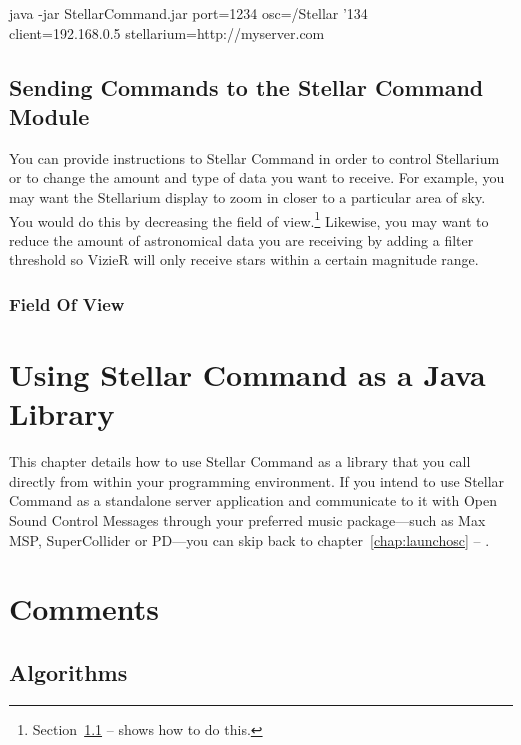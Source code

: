 \documentclass[10pt,a4paper,extrafontsizes]{memoir}
\begin{document}
   \begin{syntax}
	\medskip
	java -jar StellarCommand.jar port=1234 osc=/Stellar  {\char'134}\\client=192.168.0.5 stellarium=http://myserver.com\\
	\medskip
\end{syntax}
\bigskip

\clearpage
\pagestyle{ruled}

\section{Sending Commands to the Stellar Command Module}
You can provide instructions to Stellar Command in order to control Stellarium or to change the amount and type of data you want to receive. For example, you may want the Stellarium display to zoom in closer to a particular area of sky. You would do this by decreasing the field of view.\footnote{Section~\ref{subsec:fieldofview} --
	\emph{} shows how to do this.} Likewise, you may want to reduce the amount of astronomical data you are receiving by adding a filter threshold so VizieR will only receive stars within a certain magnitude range. 


\subsection{Field Of View}\label{subsec:fieldofview}
\chapter{Using Stellar Command as a Java Library} \label{chap:libraryosc}
This chapter details how to use Stellar Command as a library that you call directly from within your programming environment.
If you intend to use Stellar Command as a standalone server application and communicate to it with Open Sound Control Messages through your preferred music package---such as Max MSP, SuperCollider or PD---you can skip back to chapter~\ref{chap:launchosc} --
\emph{}.

    
\chapter{Comments}
\label{cha:comments}

\section{Algorithms}
\label{sec:algorithms}
\end{document}
